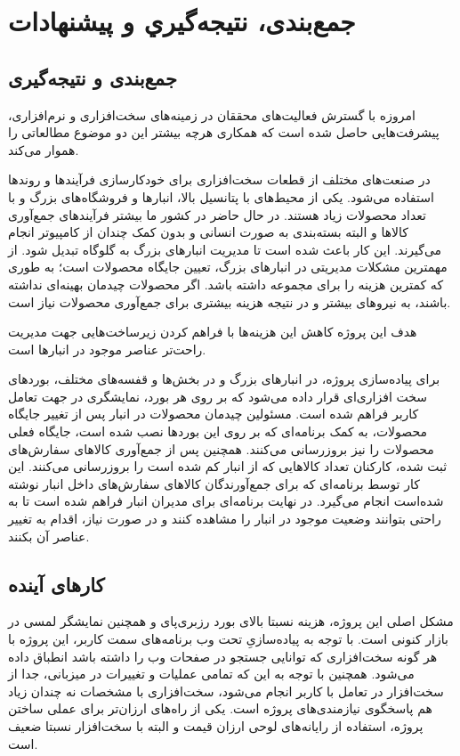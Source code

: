\chapter{جمع‌بندی، نتيجه‌گيري و پیشنهادات}

\section{جمع‌بندی و نتیجه‌گیری}
امروزه با گسترش فعالیت‌های محققان در زمینه‌های سخت‌افزاری و نرم‌افزاری، پیشرفت‌هایی حاصل شده است که همکاری هرچه بیشتر این دو موضوع مطالعاتی را هموار می‌کند.

در صنعت‌های مختلف از قطعات سخت‌افزاری برای خودکارسازی فرآیندها و روندها استفاده می‌شود. یکی از محیط‌های با پتانسیل بالا، انبارها و فروشگاه‌های بزرگ و با تعداد محصولات زیاد هستند. در حال حاضر در کشور ما بیشتر فرآیندهای جمع‌آوری کالاها و البته بسته‌بندی به صورت انسانی و بدون کمک چندان از کامپیوتر انجام می‌گیرند. این کار باعث شده است تا مدیریت انبار‌های بزرگ به گلوگاه تبدیل شود. از مهمترین مشکلات مدیریتی در انبارهای بزرگ، تعیین جایگاه محصولات است؛ به طوری که کمترین هزینه را برای مجموعه داشته باشد. اگر محصولات چیدمان بهینه‌ای نداشته باشند،‌ به نیروهای بیشتر و در نتیجه هزینه بیشتری برای جمع‌آوری محصولات نیاز است. 

هدف این پروژه کاهش این هزینه‌ها با فراهم کردن زیرساخت‌هایی جهت مدیریت راحت‌تر عناصر موجود در انبارها است. 

برای پیاده‌سازی پروژه، در انبارهای بزرگ و در بخش‌ها و قفسه‌های مختلف،‌ بورد‌های سخت افزاری‌ای قرار داده می‌شود که بر روی هر بورد، نمایشگری در جهت تعامل کاربر فراهم شده است. مسئولین چیدمان محصولات در انبار پس از تغییر جایگاه محصولات، به کمک برنامه‌ای که بر روی این بوردها نصب شده است، جایگاه فعلی محصولات را نیز بروزرسانی می‌کنند. همچنین پس از جمع‌آوری کالاهای سفارش‌های ثبت شده، کارکنان تعداد کالاهایی که از انبار کم شده است را بروزرسانی می‌کنند. این کار توسط برنامه‌ای که برای جمع‌آورندگان کالاهای سفارش‌های داخل انبار نوشته شده‌است انجام می‌گیرد. در نهایت برنامه‌ای برای مدیران انبار فراهم شده است تا به راحتی بتوانند وضعیت موجود در انبار را مشاهده کنند و در صورت نیاز، اقدام به تغییر عناصر آن بکنند.


\section{کارهای آینده}
مشکل اصلی این پروژه، هزینه نسبتا بالای بورد رزبری‌پای و همچنین نمایشگر لمسی در بازار کنونی است. با توجه به پیاده‌سازیِ تحت وب برنامه‌های سمت کاربر، این پروژه با هر گونه سخت‌افزاری که توانایی جستجو در صفحات وب را داشته باشد انطباق داده می‌شود. همچنین با توجه به این که تمامی عملیات و تغییرات در میزبانی، جدا از سخت‌افزار در تعامل با کاربر انجام می‌شود، سخت‌افزاری با مشخصات نه چندان زیاد هم پاسخگوی نیازمندی‌های پروژه است. یکی از راه‌های ارزان‌تر برای عملی ساختن پروژه، استفاده از رایانه‌های لوحی ارزان قیمت و البته با سخت‌افزار نسبتا ضعیف است.

